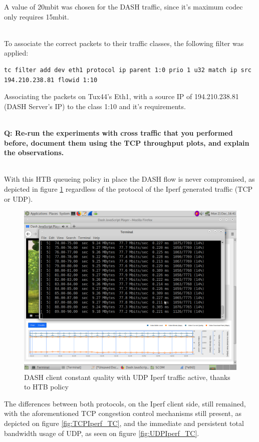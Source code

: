 \documentclass{article}
\newcommand{\Question}[1]{\textbf{Q: #1}}
\begin{document}
A value of 20mbit was chosen for the DASH traffic, since it's maximum codec only
requires 15mbit.


~\\
To associate the correct packets to their traffic classes, the following 
filter was applied: 
\begin{verbatim}
tc filter add dev eth1 protocol ip parent 1:0 prio 1 u32 match ip src 194.210.238.81 flowid 1:10
\end{verbatim}
Associating the packets on Tux44's Eth1, with a source IP of 194.210.238.81 
(DASH Server's IP) to the class 1:10 and it's requirements.

~\\
\Question{Re-run the experiments with cross traffic that you performed before, 
document them using the TCP throughput plots, and explain the observations.} 

~\\
With this HTB queueing policy in place the DASH flow is never compromised, 
as depicted in figure \ref{fig:UDPTCDASH} regardless of the protocol of the 
Iperf generated traffic (TCP or UDP).

\begin{figure}[h!]
    \centering
    \includegraphics[width=0.9\linewidth,keepaspectratio]{UDPTCDASH}
    \caption{DASH client constant quality with UDP Iperf traffic active, thanks 
             to HTB policy} 
    \label{fig:UDPTCDASH}
\end{figure}
\FloatBarrier

The differences between both protocols, on the Iperf client side, still 
remained, with the aforementioned TCP congestion control mechanisms still 
present, as depicted on figure 
\ref{fig:TCPIperf_TC}, and the immediate and persistent total bandwidth usage of
UDP, as seen on figure \ref{fig:UDPIperf_TC}.
\end{document}
